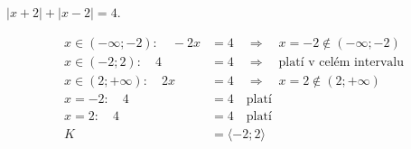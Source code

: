 \documentclass[11pt,a4paper]{article}
\begin{document}
\begin{zadaniReseniBox}[title={Samostatná práce 3}]
$|x+2|+|x-2|=4$.
\tcblower
\begin{center}
\begingroup\footnotesize
\renewcommand{\arraystretch}{1.32}
\endgroup
\end{center}
\[\begin{aligned}x\in (-\infty;-2):\quad - 2 x &= 4\quad\Longrightarrow\quad x=-2\notin (-\infty;-2)\\[2pt]
x\in (-2;2):\quad 4 &= 4\quad\Longrightarrow\quad \text{platí v celém intervalu}\\[2pt]
x\in (2;+\infty):\quad 2 x &= 4\quad\Longrightarrow\quad x=2\notin (2;+\infty)\\[2pt]
x=-2:\quad 4 &= 4\quad\text{platí}\\[2pt]
x=2:\quad 4 &= 4\quad\text{platí}\\[2pt]
K&=\langle-2;2\rangle\end{aligned}\]
\end{zadaniReseniBox}
\end{document}
